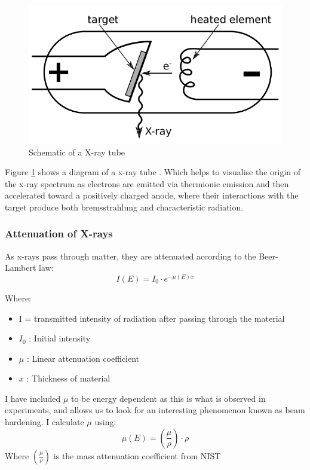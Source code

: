 \documentclass{article}
\begin{document}
\begin{figure}
  \includegraphics[width=\linewidth]{xray_tube.png}
  \caption{Schematic of a X-ray tube}
  \label{fig:X-ray tube}
\end{figure}

Figure \ref{fig:X-ray tube} \cite{Mason} shows a diagram of a x-ray tube . Which helps to visualise the origin of the x-ray spectrum as electrons are emitted via thermionic emission and then accelerated toward a positively charged anode, where their interactions with the target produce both bremsstrahlung and characteristic radiation.

\subsubsection{Attenuation of X-rays}
As x-rays pass through matter, they are attenuated according to the Beer-Lambert law: 
\begin{equation} \label{bl}
I(E) = I_0 \cdot e^{-\mu(E) x}
\end{equation}

Where:
\begin{itemize}
  \item I = transmitted intensity of radiation after passing through the material
  \item $I_0$ : Initial intensity
  \item $\mu$ : Linear attenuation coefficient
  \item $x$ : Thickness of material
\end{itemize}

I have included  $\mu$ to be energy dependent as this is what is observed in experiments, and allows us to look for an interesting phenomenon known as beam hardening. I calculate $\mu$ using:
\begin{equation} \label{linearatt}
\mu(E) = \left(\frac{\mu}{\rho}\right) \cdot \rho
\end{equation}
Where $\left(\frac{\mu}{\rho}\right)$ is the mass attenuation coefficient from NIST \cite{nistXRayMass}
\end{document}
